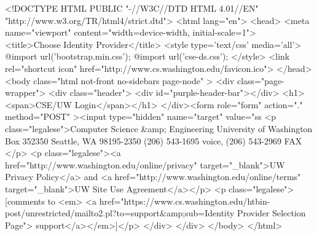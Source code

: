 <!DOCTYPE HTML PUBLIC "-//W3C//DTD HTML 4.01//EN"
        "http://www.w3.org/TR/html4/strict.dtd">
    <html lang="en">
    <head>
       <meta name="viewport" content="width=device-width, initial-scale=1">
       <title>Choose Identity Provider</title>
       <style type='text/css' media='all'>
        @import url('bootstrap.min.css');
        @import url('cse-ds.css');
       </style>
       <link rel="shortcut icon" href="http://www.cs.washington.edu/favicon.ico">
    </head>
    <body class="html not-front no-sidebars page-node" >
    <div class="page-wrapper">
    <div class="header">
    <div id="purple-header-bar"></div>
    <h1><span>CSE/UW Login</span></h1> </div><form role="form" action="." method="POST" ><input type="hidden" name="target" value="ss%
      <p class="legalese">Computer Science &amp; Engineering   
          University of Washington   Box 352350   Seattle, WA  98195-2350   
          (206) 543-1695 voice, (206) 543-2969 FAX   </p>
      <p class="legalese"><a href="http://www.washington.edu/online/privacy" 
                             target="_blank">UW Privacy Policy</a> and 
                             <a href="http://www.washington.edu/online/terms" 
                                target="_blank">UW Site Use Agreement</a></p>
      <p class="legalese">[comments to <em>
              <a href="https://www.cs.washington.edu/htbin-post/unrestricted/mailto2.pl?to=support&amp;sub=Identity Provider Selection Page">
                  support</a></em>]</p>
    </div>
    </div>
    </body>
    </html>
    
